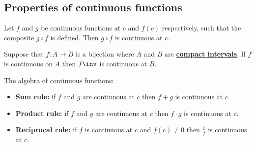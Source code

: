 \documentclass[12pt, a4paper]{article}
\begin{document}



\subsection{Properties of continuous functions}


\begin{theorem}
    Let \(f\) and \(g\) be continuous functions at \(c\) and \(f(c) \) respectively, such that the composite \(g\circ f\) is defined. Then \(g\circ f\) is continuous at \(c\).
\end{theorem}

\begin{theorem}
    Suppose that \(f:A\to B\) is a bijection where \(A\) and \(B\) are \textbf{\ul{compact intervals}}. If \(f\) is continuous on \(A\) then \(f\inv\) is continuous at \(B\).
\end{theorem}

\begin{theorem}
    The algebra of continuous functions:
    \begin{itemize}
        \item \textbf{Sum rule:} if \(f\) and \(g\) are continuous at \(c\) then \(f+g\) is continuous at \(c\).
        \item \textbf{Product rule:} if \(f\) and \(g\) are continuous at \(c\) then \(f\cdot g\) is continuous at \(c\).
        \item \textbf{Reciprocal rule:} if \(f\) is continuous at \(c\) and \(f(c) \neq 0\) then \(\frac{1}{f}\) is continuous at \(c\).
    \end{itemize}
\end{theorem}
\end{document}
